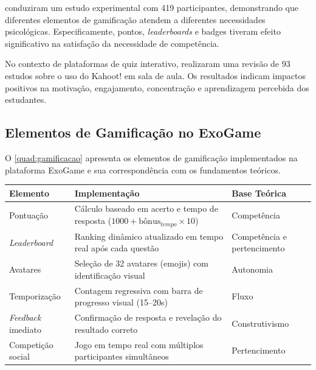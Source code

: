 \documentclass[
	12pt,
	openany,
	oneside,
	a4paper,
	english,
	brazil
]{abntex2}
\begin{document}
 conduziram um estudo experimental com 419 participantes, demonstrando que diferentes elementos de gamificação atendem a diferentes necessidades psicológicas. Especificamente, pontos, \textit{leaderboards} e badges tiveram efeito significativo na satisfação da necessidade de competência.

No contexto de plataformas de quiz interativo,  realizaram uma revisão de 93 estudos sobre o uso do Kahoot! em sala de aula. Os resultados indicam impactos positivos na motivação, engajamento, concentração e aprendizagem percebida dos estudantes.

\subsection{Elementos de Gamificação no ExoGame}

O \autoref{quad:gamificacao} apresenta os elementos de gamificação implementados na plataforma ExoGame e sua correspondência com os fundamentos teóricos.

\begin{quadro}[htb]
\caption{\label{quad:gamificacao}Elementos de gamificação implementados no ExoGame}
\begin{tabular}{|p{3.5cm}|p{4.5cm}|p{5cm}|}
	\hline
	\textbf{Elemento} & \textbf{Implementação} & \textbf{Base Teórica} \\ \hline
	Pontuação & Cálculo baseado em acerto e tempo de resposta ($1000 + \text{bônus}_{tempo} \times 10$) & Competência \cite{ryan2000} \\ \hline
	\textit{Leaderboard} & Ranking dinâmico atualizado em tempo real após cada questão & Competência e pertencimento \cite{sailer2017} \\ \hline
	Avatares & Seleção de 32 avatares (emojis) com identificação visual & Autonomia \cite{ryan2000} \\ \hline
	Temporização & Contagem regressiva com barra de progresso visual (15--20s) & Fluxo \cite{csikszentmihalyi1990} \\ \hline
	\textit{Feedback} imediato & Confirmação de resposta e revelação do resultado correto & Construtivismo \cite{piaget1964} \\ \hline
	Competição social & Jogo em tempo real com múltiplos participantes simultâneos & Pertencimento \cite{vygotsky1978} \\ \hline
\end{tabular}
\end{quadro}
\end{document}
